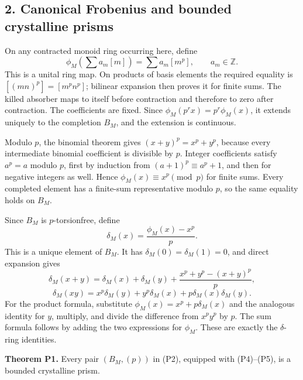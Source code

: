 \documentclass[
]{article}
\begin{document}
\subsection{2. Canonical Frobenius and bounded crystalline
prisms}\label{canonical-frobenius-and-bounded-crystalline-prisms}

On any contracted monoid ring occurring here, define \[
\phi_M\left(\sum a_m[m]\right)=\sum a_m[m^p],
\qquad a_m\in\mathbb Z.
\tag{P4}
\] This is a unital ring map. On products of basis elements the required
equality is \([(mn)^p]=[m^pn^p]\); bilinear expansion then proves it for
finite sums. The killed absorber maps to itself before contraction and
therefore to zero after contraction. The coefficients are fixed. Since
\(\phi_M(p^rx)=p^r\phi_M(x)\), it extends uniquely to the completion
\(B_M\), and the extension is continuous.

Modulo \(p\), the binomial theorem gives \((x+y)^p=x^p+y^p\), because
every intermediate binomial coefficient is divisible by \(p\). Integer
coefficients satisfy \(a^p=a\) modulo \(p\), first by induction from
\((a+1)^p\equiv a^p+1\), and then for negative integers as well. Hence
\(\phi_M(x)\equiv x^p\pmod p\) for finite sums. Every completed element
has a finite-sum representative modulo \(p\), so the same equality holds
on \(B_M\).

Since \(B_M\) is \(p\)-torsionfree, define \[
\delta_M(x)=\frac{\phi_M(x)-x^p}{p}.
\tag{P5}
\] This is a unique element of \(B_M\). It has
\(\delta_M(0)=\delta_M(1)=0\), and direct expansion gives \[
\delta_M(x+y)=\delta_M(x)+\delta_M(y)
+\frac{x^p+y^p-(x+y)^p}{p},
\] \[
\delta_M(xy)=x^p\delta_M(y)+y^p\delta_M(x)
+p\delta_M(x)\delta_M(y).
\tag{P6}
\] For the product formula, substitute \(\phi_M(x)=x^p+p\delta_M(x)\)
and the analogous identity for \(y\), multiply, and divide the
difference from \(x^py^p\) by \(p\). The sum formula follows by adding
the two expressions for \(\phi_M\). These are exactly the
\(\delta\)-ring identities.

\textbf{Theorem P1.} Every pair \((B_M,(p))\) in (P2), equipped with
(P4)--(P5), is a bounded crystalline prism.
\end{document}
